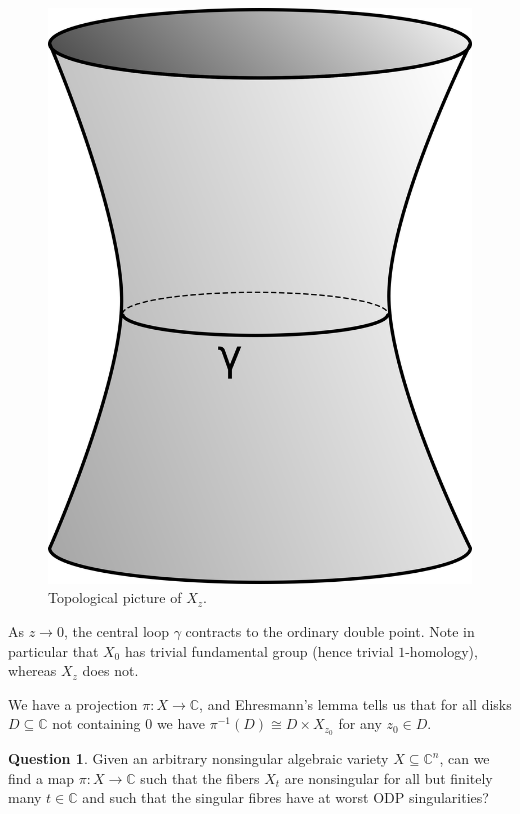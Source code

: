 \documentclass[11pt,A4]{article}
\theoremstyle{plain}
\theoremstyle{definition}
\newtheorem{q}[thm]{Question}
\theoremstyle{remark}
\newcommand{\1}{\mathbbm{1}}
\newcommand{\C}{\mathbb{C}}
\begin{document}
\begin{figure}[h]
    \centering
    \includegraphics[scale=.8]{smoothfiber}
    \caption{Topological picture of $X_{z}$.}
    \label{fig:smoothfibre}
\end{figure}

As $z\to 0$, the central loop $\gamma$ contracts to the ordinary double point.
Note in particular that $X_{0}$ has trivial fundamental group (hence trivial $1$-homology), whereas $X_{z}$ does not.

We have a projection $\pi\colon X\to \C$, and Ehresmann's lemma tells us that for all disks $D\subseteq \C$ not containing $0$ we have $\pi^{-1}(D)\cong D\times X_{z_{0}}$ for any $z_{0}\in D$.

\begin{q}
    Given an arbitrary nonsingular algebraic variety $X\subseteq \C^{n}$, can we find a map $\pi\colon X\to \C$ such that the fibers $X_{t}$ are nonsingular for all but finitely many $t\in \C$ and such that the singular fibres have at worst ODP singularities?
\end{q}
\end{document}
